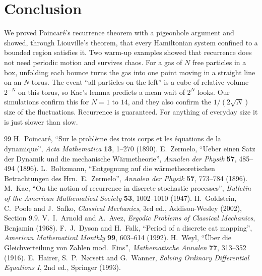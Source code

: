 \documentclass[11pt,a4paper]{article}
\theoremstyle{definition}
\begin{document}
\section{Conclusion}

We proved Poincar\'e's recurrence theorem with a pigeonhole argument and showed, through Liouville's theorem, that every Hamiltonian system confined to a bounded region satisfies it. Two warm-up examples showed that recurrence does not need periodic motion and survives chaos. For a gas of $N$ free particles in a box, unfolding each bounce turns the gas into one point moving in a straight line on an $N$-torus. The event ``all particles on the left'' is a cube of relative volume $2^{-N}$ on this torus, so Kac's lemma predicts a mean wait of $2^N$ looks. Our simulations confirm this for $N = 1$ to $14$, and they also confirm the $1/(2\sqrt N)$ size of the fluctuations. Recurrence is guaranteed. For anything of everyday size it is just slower than slow.

\begin{thebibliography}{99}
 H.~Poincar\'e, ``Sur le probl\`eme des trois corps et les \'equations de la dynamique'', \emph{Acta Mathematica} \textbf{13}, 1--270 (1890).
 E.~Zermelo, ``Ueber einen Satz der Dynamik und die mechanische W\"armetheorie'', \emph{Annalen der Physik} \textbf{57}, 485--494 (1896).
 L.~Boltzmann, ``Entgegnung auf die w\"armetheoretischen Betrachtungen des Hrn.~E.~Zermelo'', \emph{Annalen der Physik} \textbf{57}, 773--784 (1896).
 M.~Kac, ``On the notion of recurrence in discrete stochastic processes'', \emph{Bulletin of the American Mathematical Society} \textbf{53}, 1002--1010 (1947).
 H.~Goldstein, C.~Poole and J.~Safko, \emph{Classical Mechanics}, 3rd ed., Addison-Wesley (2002), Section 9.9.
 V.~I.~Arnold and A.~Avez, \emph{Ergodic Problems of Classical Mechanics}, Benjamin (1968).
 F.~J.~Dyson and H.~Falk, ``Period of a discrete cat mapping'', \emph{American Mathematical Monthly} \textbf{99}, 603--614 (1992).
 H.~Weyl, ``\"Uber die Gleichverteilung von Zahlen mod.~Eins'', \emph{Mathematische Annalen} \textbf{77}, 313--352 (1916).
 E.~Hairer, S.~P.~N{\o}rsett and G.~Wanner, \emph{Solving Ordinary Differential Equations I}, 2nd ed., Springer (1993).
\end{thebibliography}
\end{document}
